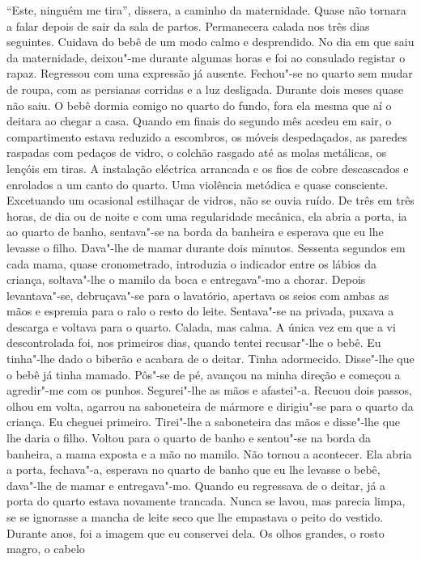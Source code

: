 ``Este, ninguém me tira'',
dissera, a caminho da maternidade. Quase não tornara a falar depois de
sair da sala de partos. Permanecera calada nos três dias seguintes.
Cuidava do bebê de um modo calmo e desprendido. No dia em que saiu da
maternidade, deixou"-me durante algumas horas e foi ao consulado
registar o rapaz. Regressou com uma expressão já ausente. Fechou"-se no
quarto sem mudar de roupa, com as persianas corridas e a luz desligada.
Durante dois meses quase não saiu. O bebê dormia comigo no quarto do
fundo, fora ela mesma que aí o deitara ao chegar a casa. Quando em
finais do segundo mês acedeu em sair, o compartimento estava reduzido a
escombros, os móveis despedaçados, as paredes raspadas com pedaços de
vidro, o colchão rasgado até as molas metálicas, os lençóis em tiras. A
instalação eléctrica arrancada e os fios de cobre descascados e
enrolados a um canto do quarto. Uma violência metódica e quase
consciente. Excetuando um ocasional estilhaçar de vidros, não se ouvia
ruído. De três em três horas, de dia ou de noite e com uma regularidade
mecânica, ela abria a porta, ia ao quarto de banho, sentava"-se na borda
da banheira e esperava que eu lhe levasse o filho. Dava"-lhe de mamar
durante dois minutos. Sessenta segundos em cada mama, quase
cronometrado, introduzia o indicador entre os lábios da criança,
soltava"-lhe o mamilo da boca e entregava"-mo a chorar. Depois
levantava"-se, debruçava"-se para o lavatório, apertava os seios com
ambas as mãos e espremia para o ralo o resto do leite. Sentava"-se na
privada, puxava a descarga e voltava para o quarto. Calada, mas calma.
A única vez em que a vi descontrolada foi, nos primeiros dias, quando
tentei recusar"-lhe o bebê. Eu tinha"-lhe dado o biberão e acabara de o
deitar. Tinha adormecido. Disse"-lhe que o bebê já tinha mamado. Pôs"-se
de pé, avançou na minha direção e começou a agredir"-me com os punhos.
Segurei"-lhe as mãos e afastei"-a. Recuou dois passos, olhou em volta,
agarrou na saboneteira de mármore e dirigiu"-se para o quarto da
criança. Eu cheguei primeiro. Tirei"-lhe a saboneteira das mãos e
disse"-lhe que lhe daria o filho. Voltou para o quarto de banho e
sentou"-se na borda da banheira, a mama exposta e a mão no mamilo. Não
tornou a acontecer. Ela abria a porta, fechava"-a, esperava no quarto de
banho que eu lhe levasse o bebê, dava"-lhe de mamar e entregava"-mo.
Quando eu regressava de o deitar, já a porta do quarto estava novamente
trancada. Nunca se lavou, mas parecia limpa, se se ignorasse a mancha de
leite seco que lhe empastava o peito do vestido. Durante anos, foi a
imagem que eu conservei dela. Os olhos grandes, o rosto magro, o cabelo

